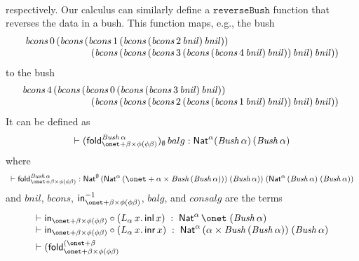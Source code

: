 \documentclass{lmcs}
\theoremstyle{plain}\newtheorem{satz}[thm]{Satz}
\newcommand{\inl}{\mathsf{inl}}
\newcommand{\inr}{\mathsf{inr}}
\newcommand{\fold}{\mathsf{fold}}
\begin{document}
{\[\begin{array}{l}
\end{array}\]
respectively. Our calculus can similarly define a
$\mathtt{reverseBush}$ function that reverses the data in a bush. This
function maps, e.g., the bush 
\[\begin{array}{l}
\mathit{bcons}\,0 \,(\mathit{bcons}\, (\mathit{bcons}\, 1\,
(\mathit{bcons}\, (\mathit{bcons}\, 2\,\mathit{bnil}) \,
\mathit{bnil}))\\ \hspace*{0.93in}(\mathit{bcons}\, (\mathit{bcons}\,
(\mathit{bcons}\, 3 \, (\mathit{bcons}\, (\mathit{bcons}\, 4\,
\mathit{bnil})\,  \mathit{bnil}))\, \mathit{bnil})\, \mathit{bnil}))
\end{array}\]
to the bush
\[\begin{array}{c}
\hspace*{-1.64in}\mathit{bcons}\,4\, (\mathit{bcons}\, (\mathit{bcons}\, 0
\,(\mathit{bcons}\, (\mathit{bcons}\, 3 \, \mathit{bnil}) \,
\mathit{bnil}))\\ 
\hspace*{0.93in}(\mathit{bcons}\, (\mathit{bcons}\, (\mathit{bcons}\, 2
\,(\mathit{bcons}\, (\mathit{bcons}\, 1 \, \mathit{bnil}) \,
\mathit{bnil})) \, \mathit{bnil})\, \mathit{bnil})) 
\end{array}\]
It can be defined as
\[\vdash (\fold^{\mathit{Bush}\,\alpha}_{\onet + \beta \times \phi (\phi \beta)})_\emptyset\, balg
: \Nat^\alpha (\mathit{Bush}\,\alpha)\,(\mathit{Bush}\,\alpha)\]
where
\[\begin{array}{lll}
\vdash \fold_{\onet + \beta \times \phi
  (\phi\beta)}^{\mathit{Bush}\,\alpha} : \Nat^{\emptyset}\, (\Nat^{\alpha}\, 
(\onet + \alpha \times \mathit{Bush}\, (\mathit{Bush}\, \alpha))) \;
(\mathit{Bush}\,\alpha))\; (\Nat^{\alpha} \,(\mathit{Bush}\,\alpha) \;
(\mathit{Bush}\,\alpha))\\
\end{array}\]
and $\mathit{bnil}$, $\mathit{bcons}$, $\tin^{-1}_{\onet + \beta
  \times \phi (\phi\beta)}$, $\mathit{balg}$, and $\mathit{consalg}$
are the terms
\[\begin{array}{l}
\vdash \tin_{\onet + \beta \times \phi (\phi\beta)} \circ (
L_{\alpha}\, x.\, \inl\, x) \; : \; \Nat^{\alpha}\, \onet\;
(\mathit{Bush}\,\alpha)\\ 
\vdash \tin_{\onet + \beta \times \phi (\phi\beta)} \circ (
L_{\alpha}\, x.\, \inr\, x ) \; : \; \Nat^{\alpha}\, (\alpha \times
\mathit{Bush}\,(\mathit{Bush}\,\alpha))\; (\mathit{Bush}\,\alpha)\\[0.05in]
\vdash (\fold_{\onet + \beta \times \phi (\phi\beta)}^{(\onet + \beta
}
\end{array}\]}
\end{document}

